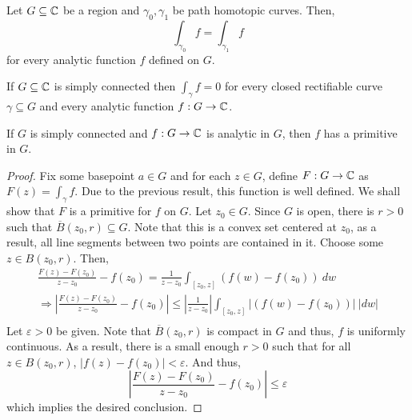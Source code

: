 \begin{corollary}
    Let $G\subseteq\mathbb{C}$ be a region and $\gamma_0,\gamma_1$ be path homotopic curves. Then, 
    \begin{equation*}
        \int_{\gamma_0} f = \int_{\gamma_1} f 
    \end{equation*}
    for every analytic function $f$ defined on $G$.
\end{corollary}

\begin{corollary}
    If $G\subseteq\mathbb{C}$ is simply connected then $\int_\gamma f = 0$ for every closed rectifiable curve $\gamma\subseteq G$ and every analytic function $f: G\to\mathbb{C}$.
\end{corollary}

\begin{theorem}
    If $G$ is simply connected and $f: G\to\mathbb{C}$ is analytic in $G$, then $f$ has a primitive in $G$.
\end{theorem}
\begin{proof}
    Fix some basepoint $a\in G$ and for each $z\in G$, define $F: G\to\mathbb{C}$ as $F(z) = \int_{\gamma} f$. Due to the previous result, this function is well defined. We shall show that $F$ is a primitive for $f$ on $G$. Let $z_0\in G$. Since $G$ is open, there is $r > 0$ such that $\overline B(z_0,r)\subseteq G$. Note that this is a convex set centered at $z_0$, as a result, all line segments between two points are contained in it. Choose some $z\in B(z_0, r)$. Then, 
    \begin{align*}
        \frac{F(z) - F(z_0)}{z - z_0} - f(z_0) = \frac{1}{z - z_0}\int_{[z_0, z]}(f(w) - f(z_0))~dw\\
        \Longrightarrow
        \left|\frac{F(z) - F(z_0)}{z - z_0} - f(z_0)\right|\le\left|\frac{1}{z - z_0}\right|\int_{[z_0, z]}\left|(f(w) - f(z_0))\right|~|dw|\\
    \end{align*}
    Let $\varepsilon > 0$ be given. Note that $\overline{B}(z_0,r)$ is compact in $G$ and thus, $f$ is uniformly continuous. As a result, there is a small enough $r > 0$ such that for all $z\in B(z_0,r)$, $|f(z) - f(z_0)| < \varepsilon$. And thus, 
    \begin{equation*}
        \left|\frac{F(z) - F(z_0)}{z - z_0} - f(z_0)\right|\le\varepsilon
    \end{equation*}
    which implies the desired conclusion.
\end{proof}

